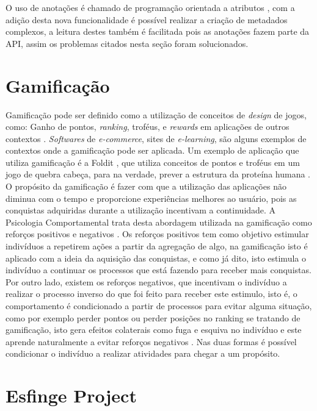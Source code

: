 O uso de anotações é chamado de programação orientada a atributos \cite{buschmann2007pattern}, com a adição desta nova funcionalidade é possível realizar a criação de metadados complexos, a leitura destes também é facilitada pois as anotações fazem parte da API, assim os problemas citados nesta seção foram solucionados.

\section{Gamificação}

\par Gamificação pode ser definido como a utilização de conceitos de \textit{design} de jogos, como: Ganho de pontos, \textit{ranking}, troféus, e \textit{rewards} em aplicações de outros contextos \cite{deterding2011gamification}. \textit{Softwares} de \textit{e-commerce}, sites de \textit{e-learning}, são alguns exemplos de contextos onde a gamificação pode ser aplicada. Um exemplo de aplicação que utiliza gamificação é a Foldit \cite{burke2012behind}, que utiliza conceitos de pontos e troféus em um jogo de quebra cabeça, para na verdade, prever a estrutura da proteína humana \cite{deterding2011gamification}. O propósito da gamificação é fazer com que a utilização das aplicações não diminua com o tempo e proporcione experiências melhores ao usuário, pois as conquistas adquiridas durante a utilização incentivam a continuidade. A Psicologia Comportamental trata desta abordagem utilizada na gamificação como reforços positivos e negativos \cite{skinner1990behavior}. Os reforços positivos tem como objetivo estimular indivíduos a repetirem ações a partir da agregação de algo, na gamificação isto é aplicado com a ideia da aquisição das conquistas, e como já dito, isto estimula o indivíduo a continuar os processos que está fazendo para receber mais conquistas. Por outro lado, existem os reforços negativos, que incentivam o indivíduo a realizar o processo inverso do que foi feito para receber este estimulo, isto é, o comportamento é condicionado a partir de processos para evitar alguma situação, como por exemplo perder pontos ou perder posições no ranking se tratando de gamificação, isto gera efeitos colaterais como fuga e esquiva no indivíduo e este aprende naturalmente a evitar reforços negativos \cite{linehan2015gamification}. Nas duas formas é possível condicionar o indivíduo a realizar atividades para chegar a um propósito.

\section{Esfinge Project}

